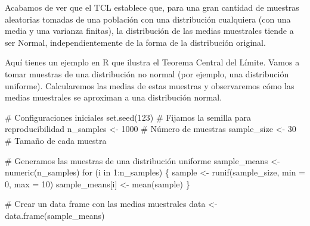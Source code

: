 \documentclass[
  letterpaper,
  DIV=11,
  numbers=noendperiod]{scrreprt}
\newenvironment{Shaded}{\begin{snugshade}}{\end{snugshade}}
\newcommand{\AttributeTok}[1]{\textcolor[rgb]{0.40,0.45,0.13}{#1}}
\newcommand{\CommentTok}[1]{\textcolor[rgb]{0.37,0.37,0.37}{#1}}
\newcommand{\ControlFlowTok}[1]{\textcolor[rgb]{0.00,0.23,0.31}{#1}}
\newcommand{\DecValTok}[1]{\textcolor[rgb]{0.68,0.00,0.00}{#1}}
\newcommand{\FunctionTok}[1]{\textcolor[rgb]{0.28,0.35,0.67}{#1}}
\newcommand{\NormalTok}[1]{\textcolor[rgb]{0.00,0.23,0.31}{#1}}
\newcommand{\OtherTok}[1]{\textcolor[rgb]{0.00,0.23,0.31}{#1}}
\newcommand{\SpecialCharTok}[1]{\textcolor[rgb]{0.37,0.37,0.37}{#1}}
\begin{document}
\begin{tcolorbox}[enhanced jigsaw, arc=.35mm, breakable, coltitle=black, left=2mm, opacityback=0, bottomtitle=1mm, colbacktitle=quarto-callout-tip-color!10!white, title=\textcolor{quarto-callout-tip-color}{\faLightbulb}\hspace{0.5em}{Ejemplo. Teorema Central del Límite}, titlerule=0mm, colback=white, colframe=quarto-callout-tip-color-frame, bottomrule=.15mm, rightrule=.15mm, opacitybacktitle=0.6, toptitle=1mm, toprule=.15mm, leftrule=.75mm]

Acabamos de ver que el TCL establece que, para una gran cantidad de
muestras aleatorias tomadas de una población con una distribución
cualquiera (con una media y una varianza finitas), la distribución de
las medias muestrales tiende a ser Normal, independientemente de la
forma de la distribución original.

Aquí tienes un ejemplo en R que ilustra el Teorema Central del Límite.
Vamos a tomar muestras de una distribución no normal (por ejemplo, una
distribución uniforme). Calcularemos las medias de estas muestras y
observaremos cómo las medias muestrales se aproximan a una distribución
normal.

\begin{Shaded}
\begin{Highlighting}[]
\CommentTok{\# Configuraciones iniciales}
\FunctionTok{set.seed}\NormalTok{(}\DecValTok{123}\NormalTok{)          }\CommentTok{\# Fijamos la semilla para reproducibilidad}
\NormalTok{n\_samples }\OtherTok{\textless{}{-}} \DecValTok{1000}      \CommentTok{\# Número de muestras}
\NormalTok{sample\_size }\OtherTok{\textless{}{-}} \DecValTok{30}      \CommentTok{\# Tamaño de cada muestra}

\CommentTok{\# Generamos las muestras de una distribución uniforme}
\NormalTok{sample\_means }\OtherTok{\textless{}{-}} \FunctionTok{numeric}\NormalTok{(n\_samples)}
\ControlFlowTok{for}\NormalTok{ (i }\ControlFlowTok{in} \DecValTok{1}\SpecialCharTok{:}\NormalTok{n\_samples) \{}
\NormalTok{  sample }\OtherTok{\textless{}{-}} \FunctionTok{runif}\NormalTok{(sample\_size, }\AttributeTok{min =} \DecValTok{0}\NormalTok{, }\AttributeTok{max =} \DecValTok{10}\NormalTok{)}
\NormalTok{  sample\_means[i] }\OtherTok{\textless{}{-}} \FunctionTok{mean}\NormalTok{(sample)}
\NormalTok{\}}

\CommentTok{\# Crear un data frame con las medias muestrales}
\NormalTok{data }\OtherTok{\textless{}{-}} \FunctionTok{data.frame}\NormalTok{(sample\_means)}


\end{Highlighting}
\end{Shaded}
\end{tcolorbox}
\end{document}
